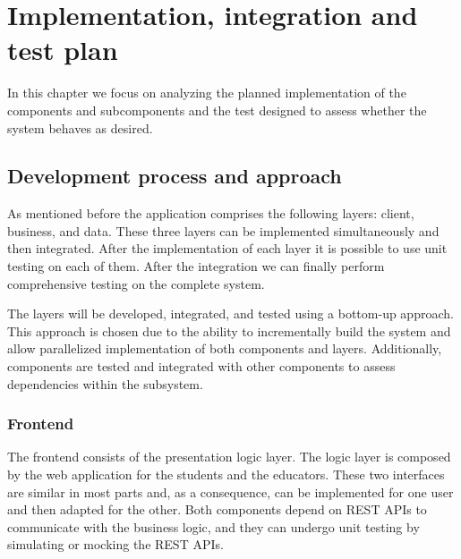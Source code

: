 \documentclass[12pt, a4paper]{report}
\begin{document}
\chapter{Implementation, integration and test plan}
    In this chapter we focus on analyzing the planned implementation of the components and subcomponents and the test designed to assess whether the system behaves as desired.

    \section{Development process and approach}
    As mentioned before the application comprises the following layers: client, business, and data. 
    These three layers can be implemented simultaneously and then integrated. 
    After the implementation of each layer it is possible to use unit testing on each of them. 
    After the integration we can finally perform comprehensive testing on the complete system. 

    The layers will be developed, integrated, and tested using a bottom-up approach. 
    This approach is chosen due to the ability to incrementally build the system and allow parallelized implementation of both components and layers. 
    Additionally, components are tested and integrated with other components to assess dependencies within the subsystem.

    \subsection{Frontend}
    The frontend consists of the presentation logic layer. 
    The logic layer is composed by the web application for the students and the educators. 
    These two interfaces are similar in most parts and, as a consequence, can be implemented for one user and then adapted for the other. 
    Both components depend on REST APIs to communicate with the business logic, and they can undergo unit testing by simulating or mocking the REST APIs.
\end{document}
